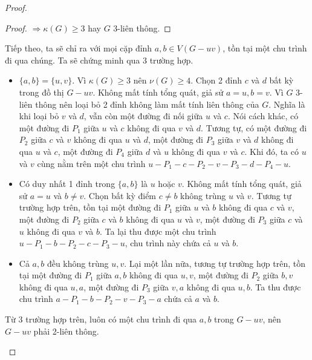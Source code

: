 \begin{proof}
\begin{enumerate}
\begin{proof}
                  $\Rightarrow \kappa(G) \geq 3$ hay $G$ 3-liên thông.
              \end{proof}
              Tiếp theo, ta sẽ chỉ ra với mọi cặp đỉnh $a,b \in V(G-uv)$, tồn tại một chu trình đi qua chúng.
              Ta sẽ chứng minh qua 3 trường hợp.
              \begin{itemize}
                  \item $\{a,b\} = \{u,v\}$. Vì $\kappa(G) \geq 3$ nên $\nu(G) \geq 4$. Chọn 2 đỉnh $c$ và $d$ bất kỳ trong đồ thị $G-uv$.
                        Không mất tính tổng quát, giả sử $a = u, b = v$. Vì $G$ 3-liên thông nên loại bỏ 2 đỉnh không làm mất tính liên thông của $G$.
                        Nghĩa là khi loại bỏ $v$ và $d$, vẫn còn một đường đi nối giữa $u$ và $c$. Nói cách khác, có một đường đi $P_1$ giữa $u$ và $c$ không đi qua $v$ và $d$.
                        Tương tự, có một đường đi $P_2$ giữa $c$ và $v$ không đi qua $u$ và $d$,
                        một đường đi $P_3$ giữa $v$ và $d$ không đi qua $u$ và $c$,
                        một đường đi $P_4$ giữa $d$ và $u$ không đi qua $v$ và $c$.
                        Khi đó, ta có $u$ và $v$ cùng nằm trên một chu trình $u-P_1-c-P_2-v-P_3-d-P_4-u$.
                  \item Có duy nhất 1 đỉnh trong $\{a,b\}$ là $u$ hoặc $v$. Không mất tính tổng quát, giả sử $a=u$ và $b \neq v$.
                        Chọn bất kỳ điểm $c \neq b$ không trùng $u$ và $v$. Tương tự trường hợp trên,
                        tồn tại một đường đi $P_1$ giữa $u$ và $b$ không đi qua $c$ và $v$,
                        một đường đi $P_2$ giữa $c$ và $b$ không đi qua $u$ và $v$,
                        một đường đi $P_3$ giữa $c$ và $u$ không đi qua $v$ và $b$. Ta lại thu được một chu trình $u-P_1-b-P_2-c-P_3-u$, chu trình này chứa cả $u$ và $b$.
                  \item Cả $a,b$ đều không trùng $u,v$. Lại một lần nữa, tương tự trường hợp trên,
                        tồn tại một đường đi $P_1$ giữa $a,b$ không đi qua $u,v$,
                        một đường đi $P_2$ giữa $b,v$ không đi qua $u,a$,
                        một đường đi $P_3$ giữa $v,a$ không đi qua $u,b$. Ta thu được chu trình $a-P_1-b-P_2-v-P_3-a$ chứa cả $a$ và $b$.
              \end{itemize}
              Từ 3 trường hợp trên, luôn có một chu trình đi qua $a,b$ trong $G-uv$, nên $G-uv$ phải 2-liên thông.

              \begin{tikzpicture}


\end{tikzpicture}
\end{enumerate}
\end{proof}
